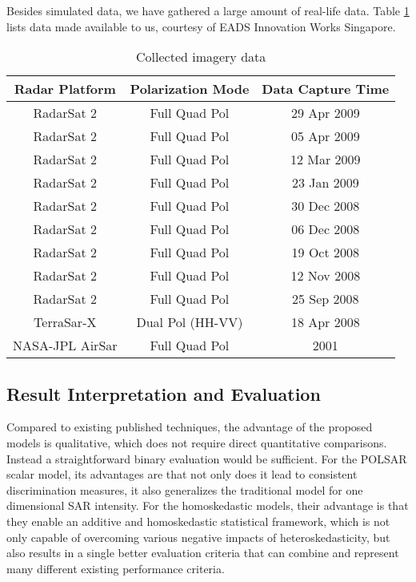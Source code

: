 Besides simulated  data, we have gathered a large amount of real-life data.
Table \ref{tbl:collected_data} lists data made available to us, courtesy of EADS Innovation Works Singapore. 

\begin{table}
\centering
\caption{Collected imagery data}
\label{tbl:collected_data}
\begin{tabular}{|c|c|c|}
\hline
Radar Platform & Polarization Mode & Data Capture Time \\
\hline
RadarSat 2 & Full Quad Pol & 29 Apr 2009 \\
RadarSat 2 & Full Quad Pol & 05 Apr 2009 \\
RadarSat 2 & Full Quad Pol & 12 Mar 2009 \\
RadarSat 2 & Full Quad Pol & 23 Jan 2009 \\
RadarSat 2 & Full Quad Pol & 30 Dec 2008 \\
RadarSat 2 & Full Quad Pol & 06 Dec 2008 \\
RadarSat 2 & Full Quad Pol & 19 Oct 2008 \\
RadarSat 2 & Full Quad Pol & 12 Nov 2008 \\
RadarSat 2 & Full Quad Pol & 25 Sep 2008 \\
TerraSar-X & Dual Pol (HH-VV) & 18 Apr 2008 \\
NASA-JPL AirSar & Full Quad Pol & 2001 \\
\hline
\end{tabular}
\end{table}

\subsection{Result Interpretation and Evaluation}

Compared
                to existing published techniques, the advantage of the
                proposed models is qualitative, which does not require
                direct quantitative comparisons.
Instead
                a straightforward binary evaluation would be sufficient.
For
                the POLSAR scalar model, its advantages are that not
                only does it lead to consistent discrimination measures, it
                also generalizes the traditional model for one
                dimensional SAR intensity.
For
                the homoskedastic models, their advantage is that they
                enable an additive and homoskedastic statistical
                framework, which is not only capable of overcoming various
                negative impacts of heteroskedasticity, but also results
                in a single better evaluation criteria that can combine
                and represent many different existing performance
                criteria.
                
